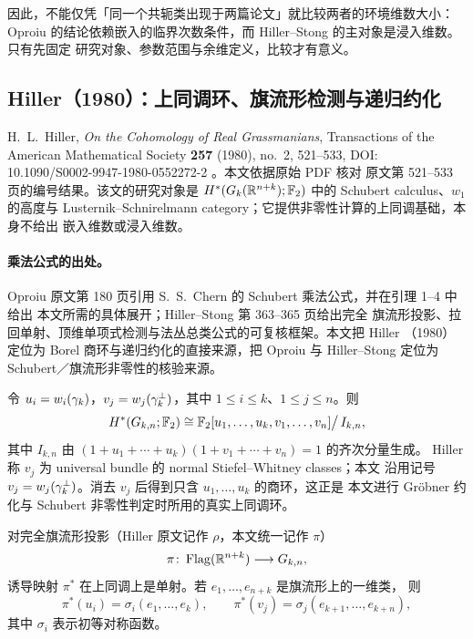 因此，不能仅凭「同一个共轭类出现于两篇论文」就比较两者的环境维数大小：Oproiu
的结论依赖嵌入的临界次数条件，而 Hiller--Stong 的主对象是浸入维数。只有先固定
研究对象、参数范围与余维定义，比较才有意义。

\FloatBarrier

\subsection{Hiller（1980）：上同调环、旗流形检测与递归约化}
\label{sec:hiller1980}

\begin{remark*}[文献核验状态]
H.~L.~Hiller, \emph{On the Cohomology of Real Grassmanians}, Transactions of
the American Mathematical Society \textbf{257} (1980), no.~2, 521--533,
DOI: 10.1090/S0002-9947-1980-0552272-2 \cite{Hiller1980}。本文依据原始 PDF 核对
原文第 521--533 页的编号结果。该文的研究对象是
$H^{*}(G_k(\mathbb{R}^{n+k});\mathbb{F}_2)$ 中的 Schubert calculus、$w_1$ 的高度与
Lusternik--Schnirelmann category；它提供非零性计算的上同调基础，本身不给出
嵌入维数或浸入维数。
\end{remark*}

\paragraph{乘法公式的出处。}
Oproiu 原文第 180 页引用 S.~S.~Chern 的 Schubert 乘法公式，并在引理 1--4 中给出
本文所需的具体展开；Hiller--Stong \cite{HillerStong1981} 第 363--365 页给出完全
旗流形投影、拉回单射、顶维单项式检测与法丛总类公式的可复核框架。本文把 Hiller
（1980）定位为 Borel 商环与递归约化的直接来源，把 Oproiu 与 Hiller--Stong 定位为
Schubert／旗流形非零性的核验来源。

\begin{theorem}\label{thm:borel}
令 $u_i=w_i(\gamma_k)$，$v_j=w_j(\gamma^{\perp}_k)$，其中 $1\le i\le k$、$1\le j\le n$。则
\begin{equation*}
  H^{*}(G_{k,n};\mathbb{F}_2)\cong
  \mathbb{F}_2[u_1,\dots,u_k,v_1,\dots,v_n]\big/\,I_{k,n},
\end{equation*}
其中 $I_{k,n}$ 由 $(1+u_1+\cdots+u_k)(1+v_1+\cdots+v_n)=1$ 的齐次分量生成。
Hiller 称 $v_j$ 为 universal bundle 的 normal Stiefel--Whitney classes；本文
沿用记号 $v_j=w_j(\gamma^{\perp}_k)$。消去 $v_j$ 后得到只含 $u_1,\dots,u_k$ 的商环，这正是
本文进行 Gr\"obner 约化与 Schubert 非零性判定时所用的真实上同调环。
\end{theorem}

\begin{theorem}\label{thm:flag}
对完全旗流形投影（Hiller 原文记作 $\rho$，本文统一记作 $\pi$）
\begin{equation*}
  \pi\colon\operatorname{Flag}(\mathbb{R}^{n+k})\longrightarrow G_{k,n},
\end{equation*}
诱导映射 $\pi^{*}$ 在上同调上是单射。若 $e_1,\dots,e_{n+k}$ 是旗流形上的一维类，
则
\begin{equation*}
  \pi^{*}(u_i)=\sigma_i(e_1,\dots,e_k),
  \qquad
  \pi^{*}(v_j)=\sigma_j(e_{k+1},\dots,e_{k+n}),
\end{equation*}
其中 $\sigma_i$ 表示初等对称函数。
\end{theorem}

